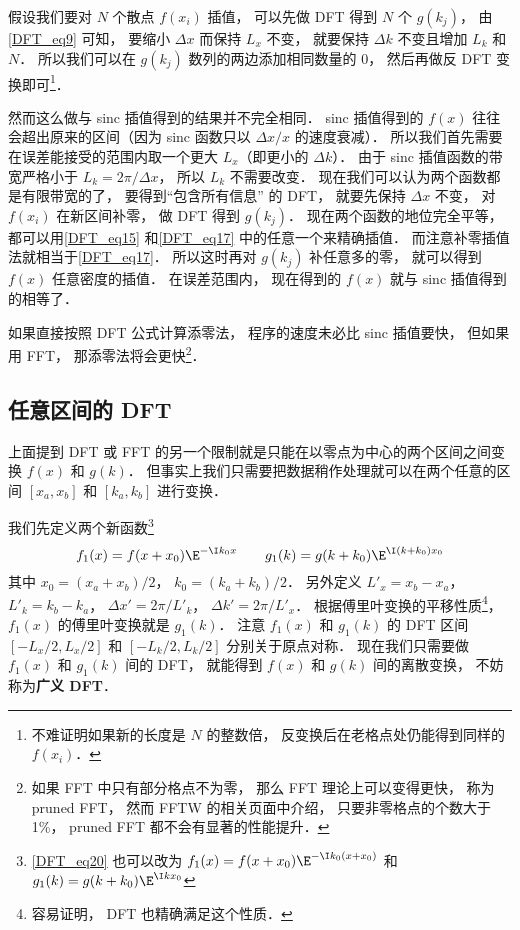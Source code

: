 假设我们要对 $N$ 个散点 $f(x_i)$ 插值， 可以先做 DFT 得到 $N$ 个 $g(k_j)$， 由\autoref{DFT_eq9} 可知， 要缩小 $\Delta x$ 而保持 $L_x$ 不变， 就要保持 $\Delta k$ 不变且增加 $L_k$ 和 $N$． 所以我们可以在 $g(k_j)$ 数列的两边添加相同数量的 0， 然后再做反 DFT 变换即可\footnote{不难证明如果新的长度是 $N$ 的整数倍， 反变换后在老格点处仍能得到同样的 $f(x_i)$．}．

然而这么做与 sinc 插值得到的结果并不完全相同． sinc 插值得到的 $f(x)$ 往往会超出原来的区间（因为 sinc 函数只以 $\Delta x/x$ 的速度衰减）． 所以我们首先需要在误差能接受的范围内取一个更大 $L_x$（即更小的 $\Delta k$）． 由于 sinc 插值函数的带宽严格小于 $L_k = 2\pi/\Delta x$， 所以 $L_k$ 不需要改变． 现在我们可以认为两个函数都是有限带宽的了， 要得到“包含所有信息” 的 DFT， 就要先保持 $\Delta x$ 不变， 对 $f(x_i)$ 在新区间补零， 做 DFT 得到 $g(k_j)$． 现在两个函数的地位完全平等， 都可以用\autoref{DFT_eq15} 和\autoref{DFT_eq17} 中的任意一个来精确插值． 而注意补零插值法就相当于\autoref{DFT_eq17}． 所以这时再对 $g(k_j)$ 补任意多的零， 就可以得到 $f(x)$ 任意密度的插值． 在误差范围内， 现在得到的 $f(x)$ 就与 sinc 插值得到的相等了．

如果直接按照 DFT 公式计算添零法， 程序的速度未必比 sinc 插值要快， 但如果用 FFT， 那添零法将会更快\footnote{如果 FFT 中只有部分格点不为零， 那么 FFT 理论上可以变得更快， 称为 pruned FFT， 然而 FFTW 的相关页面中介绍， 只要非零格点的个数大于 1\%， pruned FFT 都不会有显著的性能提升．}．

\subsection{任意区间的 DFT}
上面提到 DFT 或 FFT 的另一个限制就是只能在以零点为中心的两个区间之间变换 $f(x)$ 和 $g(k)$． 但事实上我们只需要把数据稍作处理就可以在两个任意的区间 $[x_a, x_b]$ 和 $[k_a, k_b]$ 进行变换．

我们先定义两个新函数\footnote{\autoref{DFT_eq20} 也可以改为 $f_1(x) = f(x + x_0)\E^{-\I k_0 (x+x_0)}$ 和 $g_1(k) = g(k + k_0)\E^{\I k x_0}$}
\begin{equation}\label{DFT_eq20}
f_1(x) = f(x + x_0)\E^{-\I k_0 x} \qquad g_1(k) = g(k + k_0)\E^{\I (k+k_0) x_0}
\end{equation}
其中 $x_0 = (x_a + x_b)/2$，  $k_0 = (k_a + k_b)/2$． 另外定义 $L'_x = x_b - x_a$， $L'_k = k_b-k_a$， $\Delta x' = 2\pi/L'_k$， $\Delta k' = 2\pi/L'_x$． 根据傅里叶变换的平移性质\footnote{容易证明， DFT 也精确满足这个性质．}，%
$f_1(x)$ 的傅里叶变换就是 $g_1(k)$． 注意 $f_1(x)$ 和 $g_1(k)$ 的 DFT 区间 $[-L_x/2, L_x/2]$ 和 $[-L_k/2, L_k/2]$ 分别关于原点对称． 现在我们只需要做 $f_1(x)$ 和 $g_1(k)$ 间的  DFT， 就能得到 $f(x)$ 和 $g(k)$ 间的离散变换， 不妨称为\textbf{广义 DFT}．

